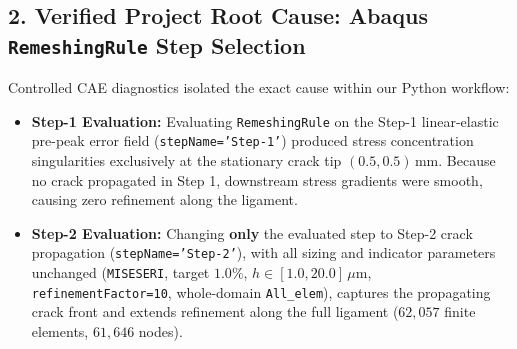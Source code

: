 \documentclass[10pt,a4paper]{article}
\begin{document}
\vspace{-0.25em}
\subsection*{2. Verified Project Root Cause: Abaqus \texttt{RemeshingRule} Step Selection}
\vspace{-0.25em}
Controlled CAE diagnostics isolated the exact cause within our Python workflow:
\begin{itemize}[itemsep=0.2pt,topsep=0.2pt,leftmargin=4mm]
  \small
  \item \textbf{Step-1 Evaluation:} Evaluating \texttt{RemeshingRule} on the Step-1 linear-elastic pre-peak error field (\texttt{stepName='Step-1'}) produced stress concentration singularities exclusively at the stationary crack tip $(0.5, 0.5)\,\mathrm{mm}$. Because no crack propagated in Step 1, downstream stress gradients were smooth, causing zero refinement along the ligament.
  \item \textbf{Step-2 Evaluation:} Changing \textbf{only} the evaluated step to Step-2 crack propagation (\texttt{stepName='Step-2'}), with all sizing and indicator parameters unchanged (\texttt{MISESERI}, target $1.0\%$, $h \in [1.0, 20.0]\,\mu\mathrm{m}$, \texttt{refinementFactor=10}, whole-domain \texttt{All\_elem}), captures the propagating crack front and extends refinement along the full ligament ($62{,}057$ finite elements, $61{,}646$ nodes).
\end{itemize}

\vspace{-0.25em}
\end{document}
